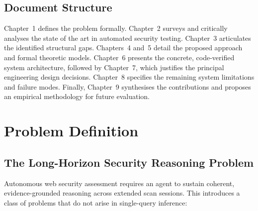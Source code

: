 \documentclass[12pt, a4paper, oneside, openany]{book}
\begin{document}
\section*{Document Structure}

Chapter~1 defines the problem formally. Chapter~2 surveys and critically analyses the state of the art in automated security testing. Chapter~3 articulates the identified structural gaps. Chapters~4 and~5 detail the proposed approach and formal theoretic models. Chapter~6 presents the concrete, code-verified system architecture, followed by Chapter~7, which justifies the principal engineering design decisions. Chapter~8 specifies the remaining system limitations and failure modes. Finally, Chapter~9 synthesises the contributions and proposes an empirical methodology for future evaluation.

\chapter{Problem Definition}
\label{chap:problem}

\section{The Long-Horizon Security Reasoning Problem}
\label{sec:lhsr}

Autonomous web security assessment requires an agent to sustain
coherent, evidence-grounded reasoning across extended scan sessions.
This introduces a class of problems that do not arise in single-query
inference:
\end{document}
